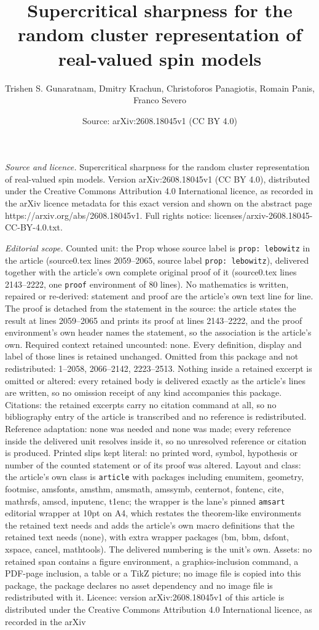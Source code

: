 \documentclass[10pt,a4paper]{amsart}
\title[Supercritical sharpness for the random cluster representatio]{Supercritical sharpness for the random cluster representation of real-valued spin models}
\author{Trishen S. Gunaratnam, Dmitry Krachun, Christoforos Panagiotis, Romain Panis, Franco Severo}
\date{Source: arXiv:2608.18045v1 (CC BY 4.0)}
\begin{document}
\maketitle

\noindent\emph{Source and licence.} Supercritical sharpness for the random cluster representation of real-valued spin models. Version arXiv:2608.18045v1 (CC BY 4.0), distributed under the Creative Commons Attribution 4.0 International licence, as recorded in the arXiv licence metadata for this exact version and shown on the abstract page https://arxiv.org/abs/2608.18045v1. Full rights notice: licenses/arxiv-2608.18045-CC-BY-4.0.txt.\par\smallskip

\noindent\textit{Editorial scope.} Counted unit: the Prop whose source label is \texttt{prop: lebowitz} in the article (source0.tex lines 2059--2065, source label \texttt{prop: lebowitz}), delivered together with the article's own complete original proof of it (source0.tex lines 2143--2222, one \texttt{proof} environment of 80 lines). No mathematics is written, repaired or re-derived: statement and proof are the article's own text line for line. The proof is detached from the statement in the source: the article states the result at lines 2059--2065 and prints its proof at lines 2143--2222, and the proof environment's own header names the statement, so the association is the article's own. Required context retained uncounted: none. Every definition, display and label of those lines is retained unchanged. Omitted from this package and not redistributed: 1--2058, 2066--2142, 2223--2513. Nothing inside a retained excerpt is omitted or altered: every retained body is delivered exactly as the article's lines are written, so no omission receipt of any kind accompanies this package. Citations: the retained excerpts carry no citation command at all, so no bibliography entry of the article is transcribed and no reference is redistributed. Reference adaptation: none was needed and none was made; every reference inside the delivered unit resolves inside it, so no unresolved reference or citation is produced. Printed slips kept literal: no printed word, symbol, hypothesis or number of the counted statement or of its proof was altered. Layout and class: the article's own class is \texttt{article} with packages including enumitem, geometry, footmisc, amsfonts, amsthm, amsmath, amssymb, centernot, fontenc, cite, mathrsfs, amscd, inputenc, t1enc; the wrapper is the lane's pinned \texttt{amsart} editorial wrapper at 10pt on A4, which restates the theorem-like environments the retained text needs and adds the article's own macro definitions that the retained text needs (none), with extra wrapper packages (bm, bbm, dsfont, xspace, cancel, mathtools). The delivered numbering is the unit's own. Assets: no retained span contains a figure environment, a graphics-inclusion command, a PDF-page inclusion, a table or a TikZ picture; no image file is copied into this package, the package declares no asset dependency and no image file is redistributed with it. Licence: version arXiv:2608.18045v1 of this article is distributed under the Creative Commons Attribution 4.0 International licence, as recorded in the arXiv 
\end{document}
